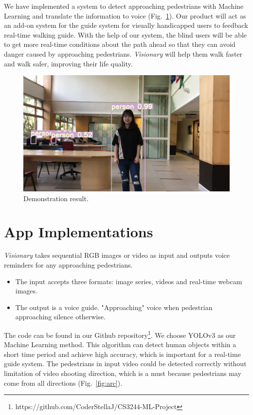 \documentclass[letterpaper]{article} %
\begin{document}
\noindent We have implemented a system to detect approaching pedestrians with Machine Learning and translate the information to voice (Fig.~\ref{fig:demo}). Our product will act as an add-on system for the guide system for visually handicapped users to feedback real-time walking guide. With the help of our system, the blind users will be able to get more real-time conditions about the path ahead so that they can avoid danger caused by approaching pedestrians. \textit{Visionary} will help them walk faster and walk safer, improving their life quality.
\begin{figure}[ht]
\hspace{0mm}
\centering
\includegraphics[width=0.85\linewidth,height = 0.5\linewidth]{Figure/demo1.png}
\caption{\footnotesize{Demonstration result.}}
\label{fig:demo}
\vspace{-5mm}
\end{figure}
\section{App Implementations}
\textit{Visionary} takes sequential RGB images or video as input and outputs voice reminders for any approaching pedestrians.
\begin{itemize}
\item The input accepts three formats: image series, videos and real-time webcam images.
\item The output is a voice guide. "Approaching" voice when pedestrian approaching silence otherwise.
\end{itemize}

\noindent The code can be found in our Github repository\footnote{https://github.com/CoderStellaJ/CS3244-ML-Project}. We choose YOLOv3 as our Machine Learning method. This algorithm can detect human objects within a short time period and achieve high accuracy, which is important for a real-time guide system. The pedestrians in input video could be detected correctly without limitation of video shooting direction, which is a must because pedestrians may come from all directions (Fig.~\ref{fig:arc}). \\
\end{document}
